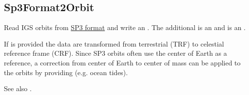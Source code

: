 \clearpage
\subsection{Sp3Format2Orbit}\label{Sp3Format2Orbit}
Read IGS orbits from \href{https://files.igs.org/pub/data/format/sp3d.pdf}{SP3 format}
and write an .
The additional  is an 
and  is an .

If  is provided the data are transformed
from terrestrial (TRF) to celestial reference frame (CRF).
Since SP3 orbits often use the center of Earth as a reference, a correction from center
of Earth to center of mass can be applied to the orbits by providing  (e.g. ocean tides).

See also .


